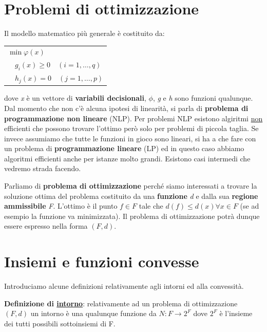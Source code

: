 \documentclass[11pt, oneside]{book}
\begin{document}
\section{Problemi di ottimizzazione}

Il modello matematico pi\`u generale \`e costituito da:

\begin{center}
  \begin{tabular}{l}
    $\min \varphi(x)$\\
    $\quad g_i(x) \geq 0 \quad (i=1,\dots,q)$\\
    $\quad h_j(x) = 0 \quad (j=1,\dots,p)$
  \end{tabular}  
\end{center}

dove {\em x} \`e un vettore di {\bf variabili decisionali}, $\phi$,
{\em g} e {\em h} sono funzioni qualunque. Dal momento che non c'\`e
alcuna ipotesi di linearit\`a, si parla di {\bf problema di
  programmazione non lineare} (NLP). Per problemi NLP esistono
algiritmi \underline{non} efficienti che possono trovare l'ottimo
per\`o solo per problemi di piccola taglia. Se invece assumiamo che
tutte le funzioni in gioco sono lineari, si ha a che fare con un
problema di {\bf programmazione lineare} (LP) ed in questo caso
abbiamo algoritmi efficienti anche per istanze molto grandi. Esistono
casi intermedi che vedremo strada facendo.

\par\bigskip

Parliamo di {\bf problema di ottimizzazione} perch\'e siamo
interessati a trovare la soluzione ottima del problema costituito da
una {\bf funzione} {\em d} e dalla sua {\bf regione ammissibile} {\em
  F}. L'ottimo \`e il punto $f \in F$ tale che $d(f) \leq d(x) \forall
x \in F$ (se ad esempio la funzione va minimizzata). Il problema di
ottimizzazione potr\`a dunque essere espresso nella forma $(F,d)$.

\section{Insiemi e funzioni convesse}

Introduciamo alcune definizioni relativamente agli intorni ed alla
convessit\`a.

\par\bigskip

{\bf Definizione di \underline{intorno}}: relativamente ad un problema
di ottimizzazione $(F,d)$ un intorno \`e una qualunque funzione da
$N:F\rightarrow 2^F$ dove $2^F$ \`e l'insieme dei tutti possibili
sottoinsiemi di F.
\end{document}
